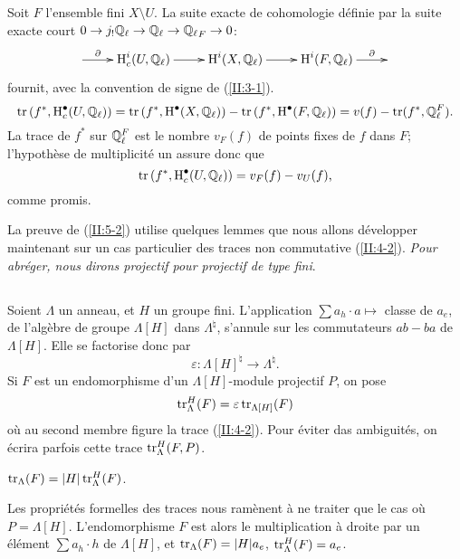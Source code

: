 \documentclass[oneside]{book}
\begin{document}
Soit $F$ l'ensemble fini $X\setminus U$. La suite exacte de cohomologie 
d\'efinie par la suite exacte court 
$0\to j_! \mathbb{Q}_\ell\to\mathbb{Q}_\ell\to{\mathbb{Q}_\ell}_F\to 0$: 
\[\xymatrix{
  \ar[r]^-\partial 
    & \h_c^i(U,\dQ_\ell) \ar[r] 
    & \h^i(X,\dQ_\ell) \ar[r] 
    & \h^i(F,\dQ_\ell) \ar[r]^-\partial 
    & 
}\]
fournit, avec la convention de signe de (\ref{II:3-1}). 
\[
  \operatorname{tr}\left(f^*,\operatorname{H}_c^\bullet(U,\mathbb{Q}_\ell)\right) 
    = \operatorname{tr}\left(f^*,\operatorname{H}^\bullet(X,\mathbb{Q}_\ell)\right) - \operatorname{tr}\left(f^*,\operatorname{H}^\bullet(F,\mathbb{Q}_\ell)\right) 
    = v(f) - \operatorname{tr}(f^*,\mathbb{Q}_\ell^F) \text{.}
\]
La trace de $f^*$ sur $\mathbb{Q}_\ell^F$ est le nombre $v_F(f)$ de points fixes de 
$f$ dans $F$; l'hypoth\`ese de multiplicit\'e un assure donc que 
\[
  \operatorname{tr}\left(f^*,\operatorname{H}_c^\bullet(U,\mathbb{Q}_\ell)\right) 
    = v_F(f) - v_U(f) \text{,}
\]
comme promis. 

La preuve de (\ref{II:5-2}) utilise quelques lemmes que nous allons 
d\'evelopper maintenant sur un cas particulier des traces non commutative 
(\ref{II:4-2}). \emph{Pour abr\'eger, nous dirons projectif pour projectif de 
type fini}. 





\subsection{}\label{II:5-5}

Soient $\Lambda$ un anneau, et $H$ un groupe fini. L'application 
$\sum a_h \cdot a\mapsto $ classe de $a_e$, de l'alg\`ebre de groupe 
$\Lambda[H]$ dans $\Lambda^\natural$, s'annule sur les commutateurs $ab-ba$ de 
$\Lambda[H]$. Elle se factorise donc par 
\[
  \varepsilon : \Lambda[H]^\natural \to \Lambda^\natural \text{.}
\]
Si $F$ est un endomorphisme d'un $\Lambda[H]$-module projectif $P$, on pose 
\[
  \operatorname{tr}_\Lambda^H(F) = \varepsilon \operatorname{tr}_{\Lambda[H]} (F) 
\]
o\`u au second membre figure la trace (\ref{II:4-2}). Pour \'eviter das 
ambiguit\'es, on \'ecrira parfois cette trace $\operatorname{tr}_\Lambda^H(F,P)$. 





\begin{proposition_}\label{II:5-6}
$\operatorname{tr}_\Lambda(F) = |H|\operatorname{tr}_\Lambda^H(F)$. 
\end{proposition_}

Les propri\'et\'es formelles des traces nous ram\`enent \`a ne traiter que le 
cas o\`u $P=\Lambda[H]$. L'endomorphisme $F$ est alors le multiplication \`a 
droite par un \'el\'ement $\sum a_h\cdot h$ de $\Lambda[H]$, et 
$\operatorname{tr}_\Lambda(F) = |H| a_e$, $\operatorname{tr}_\Lambda^H(F) = a_e$. 
\end{document}
